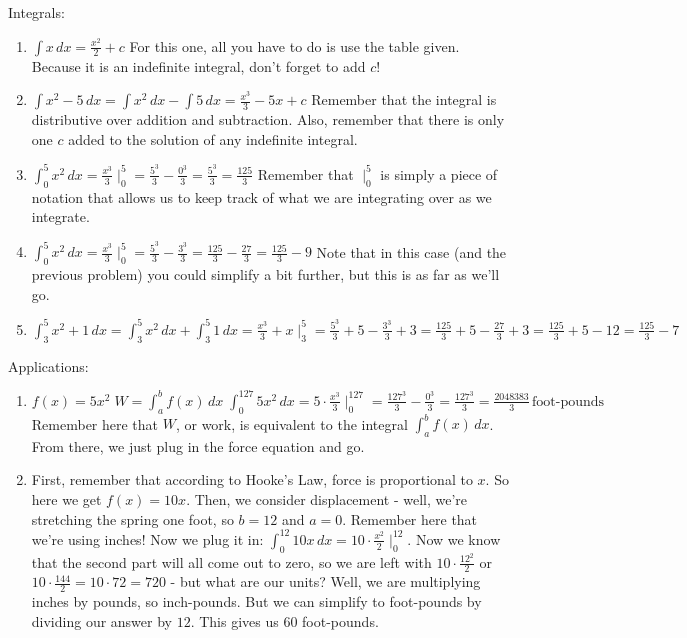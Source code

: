 Integrals: 
\begin{enumerate}
\item $\int x \, dx = \frac{x^2}{2}+c$ For this one, all you have to do is use the table given. 
Because it is an indefinite integral, don't forget to add $c$!
\item $\int x^2 - 5 \,dx = \int x^2 \, dx - \int 5 \, dx = \frac{x^3}{3}-5x + c$ Remember that the integral is distributive over addition and subtraction. 
Also, remember that there is only one $c$ added to the solution of any indefinite integral.
\item $\int^5_0 x^2 \, dx = \frac{x^3}{3}\mid^5_0 = \frac{5^3}{3}-\frac{0^3}{3}=\frac{5^3}{3}=\frac{125}{3}$ Remember that $\mid^5_0$ is simply a piece of notation that allows us to keep track of what we are integrating over as we integrate.
\item $\int^5_0 x^2 \, dx = \frac{x^3}{3}\mid^5_0 = \frac{5^3}{3}-\frac{3^3}{3} = \frac{125}{3} - \frac{27}{3} = \frac{125}{3}-9$ Note that in this case (and the previous problem) you could simplify a bit further, but this is as far as we'll go.
\item $\int^5_3 x^2 + 1\, dx = \int^5_3 x^2 \, dx + \int^5_3 1 \, dx = \frac{x^3}{3}+x\mid^5_3 = \frac{5^3}{3}+5 - \frac{3^3}{3}+3 = \frac{125}{3}+5 - \frac{27}{3}+3 = \frac{125}{3}+5 - 12 = \frac{125}{3}-7$
\end{enumerate}

Applications:
\begin{enumerate}
\item $f(x) = 5x^2 \; W = \int^b_a f(x) \, dx \; \int^127_0 5x^2 \, dx = 5\cdot \frac{x^3}{3}\mid^{127}_0 = \frac{127^3}{3}-\frac{0^3}{3} = \frac{127^3}{3} = \frac{2048383}{3} \,\text{foot-pounds}$
Remember here that $W$, or work, is equivalent to the integral $\int^b_a f(x) \, dx$. From there, we just plug in the force equation and go.
\item First, remember that according to Hooke's Law, force is proportional to $x$. 
So here we get $f(x) = 10x$. 
Then, we consider displacement - well, we're stretching the spring one foot, so $b=12$ and $a = 0$. 
Remember here that we're using inches! 
Now we plug it in: $\int^{12}_0 10x \, dx = 10\cdot\frac{x^2}{2}\mid^{12}_0$. 
Now we know that the second part will all come out to zero, so we are left with $10\cdot\frac{12^2}{2}$ or $10\cdot\frac{144}{2} = 10\cdot 72 = 720$ - but what are our units? 
Well, we are multiplying inches by pounds, so inch-pounds. 
But we can simplify to foot-pounds by dividing our answer by $12$. This gives us $60$ foot-pounds.
\end{enumerate}
